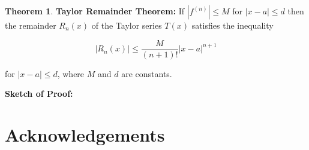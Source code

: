 \documentclass[11pt, oneside]{article}   	%
\theoremstyle{definition}
\newtheorem{thm}{Theorem}[section]
\theoremstyle{definition}
\theoremstyle{remark}
\begin{document}
\bigskip
\noindent


\begin{thm}
{\bf Taylor Remainder Theorem:}  If $|f^{(n)}| \leq M$ for $|x - a| \leq d$ then the remainder $R_n(x)$ of the
Taylor series $T(x)$ satisfies the inequality

\begin{equation*}
\big | R_n(x) \big |  \leq \frac{M}{(n+1)!} |x -a|^{n+1}
\end{equation*}
\end{thm}
\bigskip
\noindent
for $|x-a| \leq d$, where $M$ and $d$ are constants.

\bigskip
\noindent
{\bf Sketch of Proof: }

\newpage
\section*{Acknowledgements}



\end{document}
